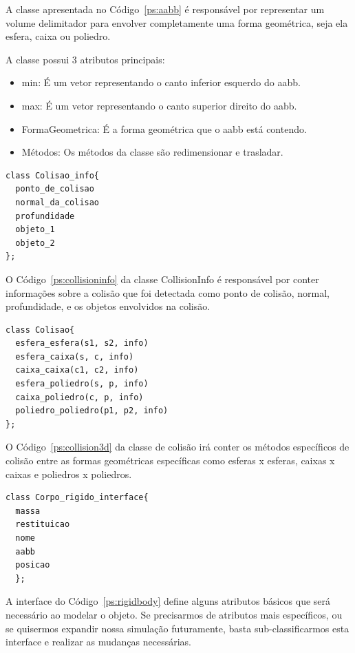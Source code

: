 A classe apresentada no Código~\ref{ps:aabb}  é responsável por representar um volume delimitador para envolver completamente uma forma geométrica, seja ela esfera, caixa ou poliedro.

A classe possui 3 atributos principais:
\begin{itemize}
  \item min: É um vetor representando o canto inferior esquerdo do aabb.
  \item max: É um vetor representando o canto superior direito do aabb.
  \item FormaGeometrica: É a forma geométrica que o aabb está contendo.
  \item Métodos: Os métodos da classe são redimensionar e trasladar.
\end{itemize}

\begin{lstlisting}[frame=single,caption=Modelagem prévia para coletor de informações\label{ps:collisioninfo}]
class Colisao_info{
  ponto_de_colisao
  normal_da_colisao
  profundidade
  objeto_1
  objeto_2
};
\end{lstlisting}

O Código~\ref{ps:collisioninfo} da classe CollisionInfo é responsável por conter informações sobre a colisão que foi detectada como ponto de colisão, normal, profundidade, e os objetos envolvidos na colisão.

\begin{lstlisting}[frame=single,caption=Modelagem prévia para classe estática para colisões\label{ps:collision3d}]
class Colisao{
  esfera_esfera(s1, s2, info)
  esfera_caixa(s, c, info)
  caixa_caixa(c1, c2, info)
  esfera_poliedro(s, p, info)
  caixa_poliedro(c, p, info)
  poliedro_poliedro(p1, p2, info)
};
\end{lstlisting}

O Código~\ref{ps:collision3d} da classe de colisão irá conter os métodos específicos de colisão entre as formas geométricas específicas como esferas x esferas, caixas x caixas e poliedros x poliedros.

\begin{lstlisting}[frame=single,caption=Modelagem prévia para interface de corpo rígido\label{ps:rigidbody}]
class Corpo_rigido_interface{
  massa
  restituicao
  nome
  aabb
  posicao
  };
\end{lstlisting}

A interface do Código~\ref{ps:rigidbody} define alguns atributos básicos que será necessário ao modelar o objeto. Se precisarmos de atributos mais específicos, ou se quisermos expandir nossa simulação futuramente, basta sub-classificarmos esta interface e realizar as mudanças necessárias.

